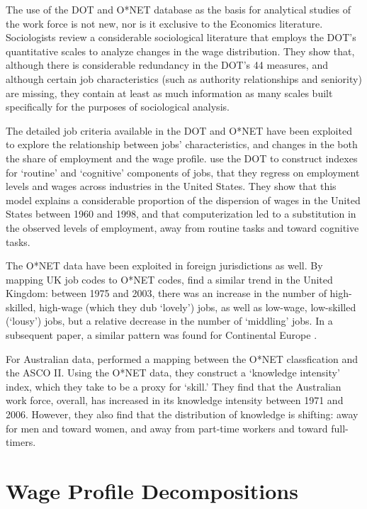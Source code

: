 The use of the DOT and O*NET database as the basis for analytical studies of the work force is not new, nor is it exclusive to the Economics literature. Sociologists \citet{Cain1981} review a considerable sociological literature that employs the DOT's quantitative scales to analyze changes in the wage distribution. They show that, although there is considerable redundancy in the DOT's 44 measures, and although certain job characteristics (such as authority relationships and seniority) are missing, they contain at least as much information as many scales built specifically for the purposes of sociological analysis.

The detailed job criteria available in the DOT and O*NET have been exploited to explore the relationship between jobs' characteristics, and changes in the both the share of employment and the wage profile.
\citet{Levy2003} use the DOT to construct indexes for `routine' and `cognitive' components of jobs, that they regress on employment levels and wages across industries in the United States. They show that this model explains a considerable proportion of the dispersion of wages in the United States between 1960 and 1998, and that computerization led to a substitution in the observed levels of employment, away from routine tasks and toward cognitive tasks. 

The O*NET data have been exploited in foreign jurisdictions as well. By mapping UK job codes to O*NET codes, \citet{Goos2007} find a similar trend in the United Kingdom: between 1975 and 2003, there was an increase in the number of high-skilled, high-wage (which they dub `lovely') jobs, as well as low-wage, low-skilled (`lousy') jobs, but a relative decrease in the number of `middling' jobs. In a subsequent paper, a similar pattern was found for Continental Europe \citep{Goos2009}.

For Australian data, \citet{Esposto2011} performed a mapping between the O*NET classfication and the ASCO II. Using the O*NET data, they  construct a `knowledge intensity' index, which they take to be a proxy for `skill.' They find that the Australian work force, overall, has increased in its knowledge intensity between 1971 and 2006. However, they also find that the distribution of knowledge is shifting: away for men and toward women, and away from part-time workers and toward full-timers.

\section{Wage Profile Decompositions}

